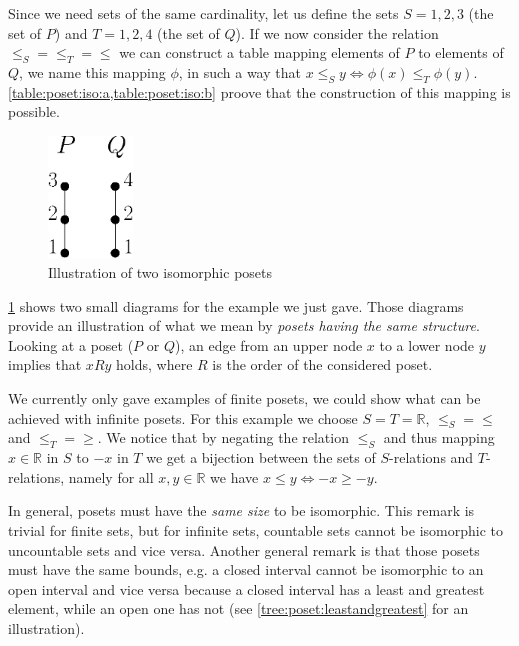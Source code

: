 Since we need sets of the same cardinality, let us define the sets $S = {1, 2, 3}$ (the set of $P$) and $T = {1, 2, 4}$ (the set of $Q$). If we now consider the relation $\le_S = \le_T = \le$ we can construct a table mapping elements of $P$ to elements of $Q$, we name this mapping $\phi$, in such a way that $x \le_S y \iff \phi(x) \le_T \phi(y)$. \cref{table:poset:iso:a,table:poset:iso:b} proove that the construction of this mapping is possible.

\begin{figure}
	\centering
	\includegraphics[width=0.2\textwidth]{fig/poset/iso/a}
	\caption{Illustration of two isomorphic posets}
	\label{fig:poset:iso:a}
\end{figure}

\ref{fig:poset:iso:a} shows two small diagrams for the example we just gave. Those diagrams provide an illustration of what we mean by \emph{posets having the same structure}. Looking at a poset ($P$ or $Q$), an edge from an upper node $x$ to a lower node $y$ implies that $x R y$ holds, where $R$ is the order of the considered poset.


We currently only gave examples of finite posets, we could show what can be achieved with infinite posets. For this example we choose $S = T = \mathbb{R}$, $\le_S = \le$ and $\le_T = \ge$. We notice that by negating the relation $\le_S$ and thus mapping $x \in \mathbb{R}$ in $S$ to $-x$ in $T$ we get a bijection between the sets of $S$-relations and $T$-relations, namely for all $x, y \in \mathbb{R}$ we have $x \le y \iff -x \ge -y$.

In general, posets must have the \emph{same size} to be isomorphic. This remark is trivial for finite sets, but for infinite sets, countable sets cannot be isomorphic to uncountable sets and vice versa. Another general remark is that those posets must have the same bounds, e.g. a closed interval cannot be isomorphic to an open interval and vice versa because a closed interval has a least and greatest element, while an open one has not (see \ref{tree:poset:leastandgreatest} for an illustration).

